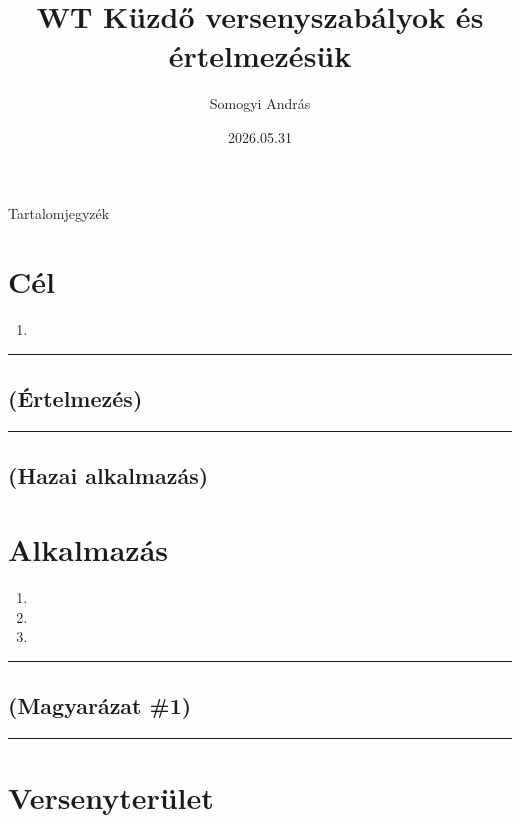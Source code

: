 \documentclass[]{report}
\title{WT Küzdő versenyszabályok és értelmezésük}
\author{Somogyi András}
\date{2026.05.31}
\providecommand{\tightlist}{%
  \setlength{\itemsep}{0pt}\setlength{\parskip}{0pt}}
\newenvironment{expl}[0]%
  {\rule{\textwidth}{.2pt}\footnotesize}%
  {\rule{\textwidth}{.2pt}\normalsize}
\newenvironment{hunexpl}[0]%
  {\footnotesize\itshape}%
  {\normalsize}
\begin{document}
\maketitle

\etocsettocstyle
  {\Huge\begin{center}
      Tartalomjegyzék
   \end{center}
   \normalsize
  }
  {}

\tableofcontents


\chapter{Cél}

\begin{enumerate}
\tightlist
\item

\end{enumerate}

\begin{expl}
\section*{(Értelmezés)}

\end{expl}

\begin{hunexpl}
\section*{(Hazai alkalmazás)}

\end{hunexpl}


\chapter{Alkalmazás}

\begin{enumerate}
\item

\item

\item

\end{enumerate}

\begin{expl}
\section*{(Magyarázat \#1)}

\end{expl}


\chapter{Versenyterület}
\end{document}
